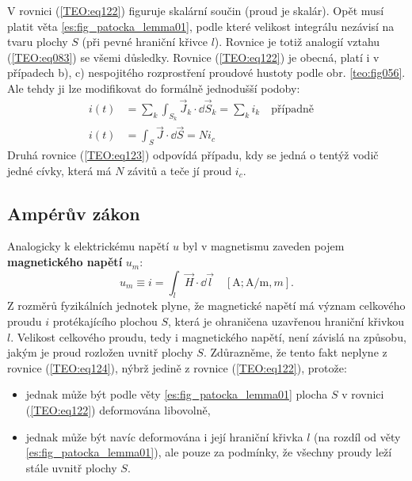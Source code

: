         V rovnici (\ref{TEO:eq122}) figuruje skalární součin (proud je skalár). Opět musí platit
        věta \ref{es:fig_patocka_lemma01}, podle které velikost integrálu nezávisí na tvaru plochy
        \(S\) (při pevné hraniční křivce \(l\)). Rovnice je totiž analogií vztahu (\ref{TEO:eq083})
        se všemi důsledky. Rovnice (\ref{TEO:eq122}) je obecná, platí i v případech b), c)
        nespojitého rozprostření proudové hustoty podle obr. \ref{teo:fig056}. Ale tehdy ji lze
        modifikovat do formálně jednodušší podoby:
        \begin{align}
          i(t) &= \sum_k\int_{S_k}\vec{J}_k\cdot \dd{\vec{S}}_k = \sum_k i_k 
                  \quad\text{případně}\quad                         \nonumber \\
          i(t) &= \int_S\vec{J}\cdot \dd{\vec{S}} = Ni_c                  \label{TEO:eq123}
        \end{align} 
        Druhá rovnice (\ref{TEO:eq123}) odpovídá případu, kdy se jedná o tentýž vodič jedné 
        cívky, která má \(N\) závitů a teče jí proud \(i_c\).
      
      \subsection{Ampérův zákon}
        Analogicky k elektrickému napětí \(u\) byl v magnetismu zaveden pojem \textbf{magnetického 
        napětí} \(u_m\):
        \begin{equation}\label{TEO:eq124}
          u_m \equiv i = \int_l \vec{H}\cdot \dd{\vec{l}} \quad [\unit{\A}; \unit{\A\per\m}, \unit{m}].
        \end{equation} 
        Z rozměrů fyzikálních jednotek plyne, že magnetické napětí má význam celkového proudu \(i\)
        protékajícího plochou \(S\), která je ohraničena uzavřenou hraniční křivkou \(l\). Velikost
        celkového proudu, tedy i magnetického napětí, není závislá na způsobu, jakým je proud
        rozložen uvnitř plochy \(S\). Zdůrazněme, že tento fakt neplyne z rovnice (\ref{TEO:eq124}),
        nýbrž jedině z rovnice (\ref{TEO:eq122}), protože:
        \begin{itemize}         
          \item jednak může být podle věty \ref{es:fig_patocka_lemma01} plocha \(S\) v rovnici 
                (\ref{TEO:eq122}) deformována libovolně,
          \item jednak může být navíc deformována i její hraniční křivka \(l\) (na rozdíl od věty 
                \ref{es:fig_patocka_lemma01}), ale pouze za podmínky, že všechny proudy leží stále 
                uvnitř plochy \(S\).
        \end{itemize}
        
